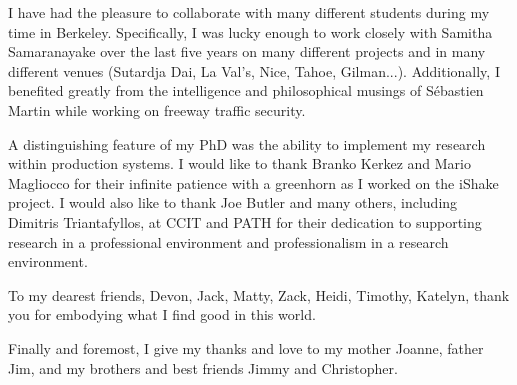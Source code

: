 I have had the pleasure to collaborate with many different students during my time in Berkeley. Specifically, I was lucky enough to work closely with Samitha Samaranayake over the last five years on many different projects and in many different venues (Sutardja Dai, La Val's, Nice, Tahoe, Gilman...). Additionally, I benefited greatly from the intelligence and philosophical musings of S\'{e}bastien Martin while working on freeway traffic security.

A distinguishing feature of my PhD was the ability to implement my research within production systems. I would like to thank Branko Kerkez and Mario Magliocco for their infinite patience with a greenhorn as I worked on the iShake project. I would also like to thank Joe Butler and many others, including Dimitris Triantafyllos, at CCIT and PATH for their dedication to supporting research in a professional environment and professionalism in a research environment.

To my dearest friends, Devon, Jack, Matty, Zack, Heidi, Timothy, Katelyn, thank you for embodying what I find good in this world.

Finally and foremost, I give my thanks and love to my mother Joanne, father Jim, and my brothers and best friends Jimmy and Christopher.